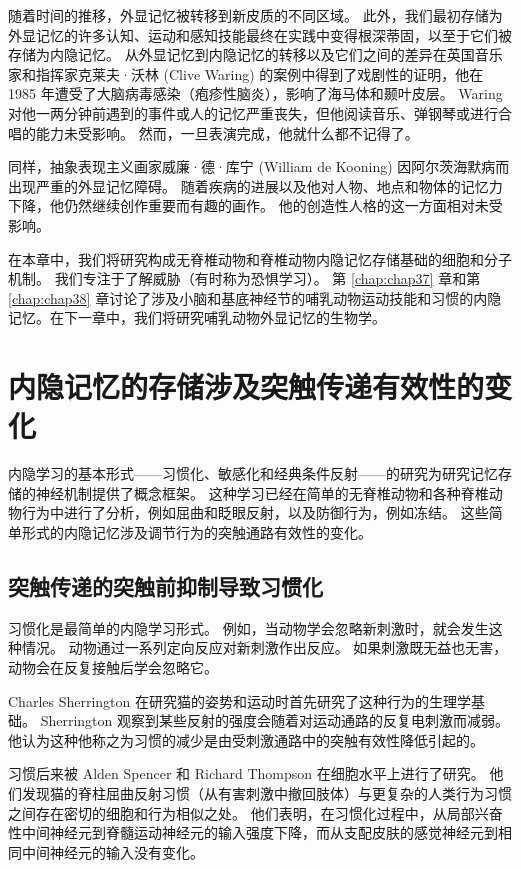 随着时间的推移，外显记忆被转移到新皮质的不同区域。 此外，我们最初存储为外显记忆的许多认知、运动和感知技能最终在实践中变得根深蒂固，以至于它们被存储为内隐记忆。 从外显记忆到内隐记忆的转移以及它们之间的差异在英国音乐家和指挥家克莱夫·沃林 (Clive Waring) 的案例中得到了戏剧性的证明，他在 1985 年遭受了大脑病毒感染（疱疹性脑炎），影响了海马体和颞叶皮层。 Waring 对他一两分钟前遇到的事件或人的记忆严重丧失，但他阅读音乐、弹钢琴或进行合唱的能力未受影响。 然而，一旦表演完成，他就什么都不记得了。

同样，抽象表现主义画家威廉·德·库宁 (William de Kooning) 因阿尔茨海默病而出现严重的外显记忆障碍。 随着疾病的进展以及他对人物、地点和物体的记忆力下降，他仍然继续创作重要而有趣的画作。 他的创造性人格的这一方面相对未受影响。

在本章中，我们将研究构成无脊椎动物和脊椎动物内隐记忆存储基础的细胞和分子机制。 我们专注于了解威胁（有时称为恐惧学习）。 第 \ref{chap:chap37} 章和第 \ref{chap:chap38} 章讨论了涉及小脑和基底神经节的哺乳动物运动技能和习惯的内隐记忆。在下一章中，我们将研究哺乳动物外显记忆的生物学。


\section{内隐记忆的存储涉及突触传递有效性的变化}
内隐学习的基本形式——习惯化、敏感化和经典条件反射——的研究为研究记忆存储的神经机制提供了概念框架。 这种学习已经在简单的无脊椎动物和各种脊椎动物行为中进行了分析，例如屈曲和眨眼反射，以及防御行为，例如冻结。 这些简单形式的内隐记忆涉及调节行为的突触通路有效性的变化。

\subsection{突触传递的突触前抑制导致习惯化}
习惯化是最简单的内隐学习形式。 例如，当动物学会忽略新刺激时，就会发生这种情况。 动物通过一系列定向反应对新刺激作出反应。 如果刺激既无益也无害，动物会在反复接触后学会忽略它。

Charles Sherrington 在研究猫的姿势和运动时首先研究了这种行为的生理学基础。 Sherrington 观察到某些反射的强度会随着对运动通路的反复电刺激而减弱。 他认为这种他称之为习惯的减少是由受刺激通路中的突触有效性降低引起的。

习惯后来被 Alden Spencer 和 Richard Thompson 在细胞水平上进行了研究。 他们发现猫的脊柱屈曲反射习惯（从有害刺激中撤回肢体）与更复杂的人类行为习惯之间存在密切的细胞和行为相似之处。 他们表明，在习惯化过程中，从局部兴奋性中间神经元到脊髓运动神经元的输入强度下降，而从支配皮肤的感觉神经元到相同中间神经元的输入没有变化。

